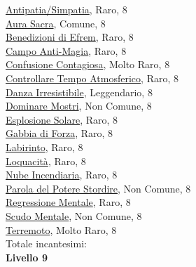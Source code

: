 \begin{multicols}{3}
{{\hyperlink{Antipatia/Simpatia}{Antipatia/Simpatia}, Raro, 8\\
\hyperlink{Aura Sacra}{Aura Sacra}, Comune, 8\\
\hyperlink{Benedizioni di Efrem}{Benedizioni di Efrem}, Raro, 8\\
\hyperlink{Campo Anti-Magia}{Campo Anti-Magia}, Raro, 8\\
\hyperlink{Confusione Contagiosa}{Confusione Contagiosa}, Molto Raro, 8\\
\hyperlink{Controllare Tempo Atmosferico}{Controllare Tempo Atmosferico}, Raro, 8\\
\hyperlink{Danza Irresistibile}{Danza Irresistibile}, Leggendario, 8\\
\hyperlink{Dominare Mostri}{Dominare Mostri}, Non Comune, 8\\
\hyperlink{Esplosione Solare}{Esplosione Solare}, Raro, 8\\
\hyperlink{Gabbia di Forza}{Gabbia di Forza}, Raro, 8\\
\hyperlink{Labirinto}{Labirinto}, Raro, 8\\
\hyperlink{Loquacità}{Loquacità}, Raro, 8\\
\hyperlink{Nube Incendiaria}{Nube Incendiaria}, Raro, 8\\
\hyperlink{Parola del Potere Stordire}{Parola del Potere Stordire}, Non Comune, 8\\
\hyperlink{Regressione Mentale}{Regressione Mentale}, Raro, 8\\
\hyperlink{Scudo Mentale}{Scudo Mentale}, Non Comune, 8\\
\hyperlink{Terremoto}{Terremoto}, Molto Raro, 8\\

\medskip Totale incantesimi: \theinclvotto\\

\textbf{Livello 9} 

}}
\end{multicols}
